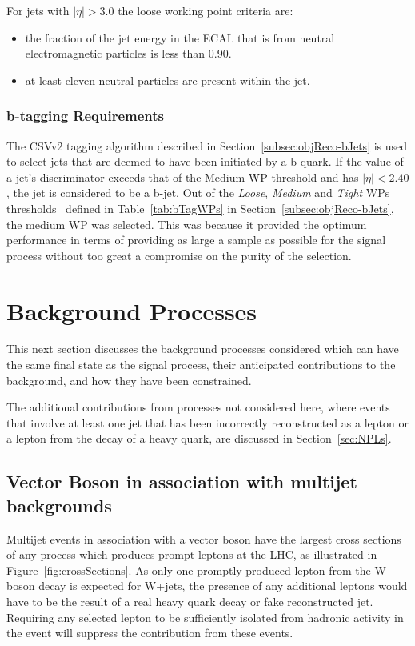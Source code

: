 For jets with $|\eta| > 3.0$ the loose working point criteria are:
\begin{itemize}
\item the fraction of the jet energy in the ECAL that is from neutral electromagnetic particles is less than $0.90$.
\item at least eleven neutral particles are present within the jet.
\end{itemize}

\subsubsection{b-tagging Requirements}\label{subsubsec:bTag}
The CSVv2 tagging algorithm described in Section~\ref{subsec:objReco-bJets} is used to select jets that are deemed to have been initiated by a b-quark.
If the value of a jet's discriminator exceeds that of the Medium WP threshold and has $|\eta| < 2.40$, the jet is considered to be a b-jet.
Out of the \emph{Loose}, \emph{Medium} and \emph{Tight} WPs thresholds~\cite{Sirunyan:2017ezt} defined in Table~\ref{tab:bTagWPs} in Section~\ref{subsec:objReco-bJets}, the medium WP was selected.
This was because it provided the optimum performance in terms of providing as large a sample as possible for the signal process without too great a compromise on the purity of the selection.

\section{Background Processes}\label{sec:backgroundProcesses}
This next section discusses the background processes considered which can have the same final state as the signal process, their anticipated contributions to the background, and how they have been constrained.

The additional contributions from processes not considered here, where events that involve at least one jet that has been incorrectly reconstructed as a lepton or a lepton from the decay of a heavy quark, are discussed in Section~\ref{sec:NPLs}.

\subsection{Vector Boson in association with multijet backgrounds}
Multijet events in association with a vector boson have the largest cross sections of any process which produces prompt leptons at the LHC, as illustrated in Figure~\ref{fig:crossSections}.
As only one promptly produced lepton from the W boson decay is expected for W+jets, the presence of any additional leptons would have to be the result of a real heavy quark decay or fake reconstructed jet. 
Requiring any selected lepton to be sufficiently isolated from hadronic activity in the event will suppress the contribution from these events.

